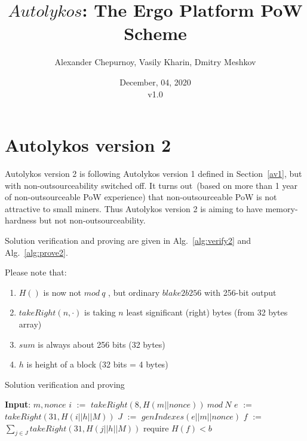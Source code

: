 \documentclass[]{article}
\newcommand{\Name}{$Autolykos$}
\def\Let#1#2{\State #1 $:=$ #2}
\begin{document}
    \title{\Name: The Ergo Platform PoW Scheme}

    \author{Alexander Chepurnoy, Vasily Kharin, Dmitry Meshkov}

    \date{December, 04, 2020\\v1.0}
    \maketitle

    \section{Autolykos version 2}

    Autolykos version 2 is following Autolykos version 1 defined in Section~\ref{av1}, but with non-outsourceability 
    switched off. It turns out~(based on more than 1 year of non-outsourceable PoW experience) that non-outsourceable 
    PoW is not attractive to small miners. Thus Autolykos version 2 is aiming to have memory-hardness but not non-outsourceability.

    
    Solution verification and proving are given in Alg.~\ref{alg:verify2} and Alg.~\ref{alg:prove2}.

    Please note that:
    \begin{enumerate}
        \item{} $H()$ is now not $mod\ q$ , but ordinary $blake2b256$ with 256-bit output
        \item{} $takeRight(n, \cdot)$ is taking $n$ least significant (right) bytes (from 32 bytes array)
        \item{} $sum$ is always about 256 bits (32 bytes)
        \item{} $h$ is height of a block (32 bits = 4 bytes)
    \end{enumerate} 

    \begin{algorithm}[H]
        \caption{Solution verification and proving}
        \label{alg:verify2}
        \begin{algorithmic}[1]
            \State \textbf{Input}: $m, nonce$
            \Let{$i$}{$takeRight(8, H(m || nonce))\ mod\ N$}
            \Let{$e$}{$takeRight(31, H(i || h || M))$}
            \Let{$J$}{$genIndexes(e || m || nonce)$}
            \Let{$f$}{$\sum_{j \in J} takeRight(31, H(j || h || M))$}
            \State require $H(f) < b$
        \end{algorithmic}
    \end{algorithm}
\end{document}

